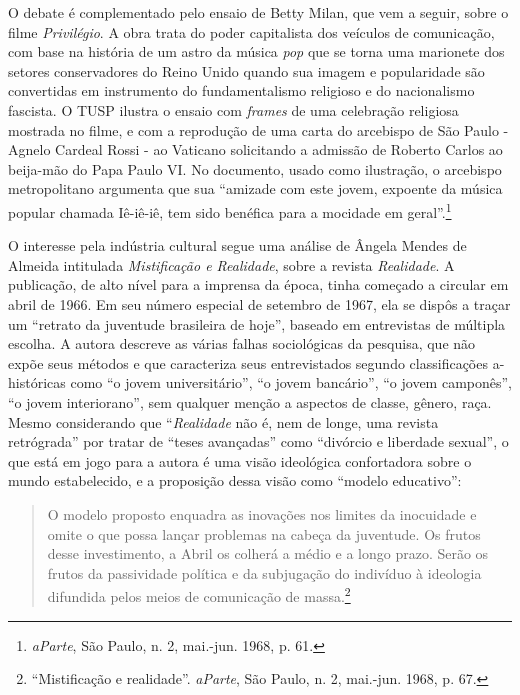 O debate é complementado pelo ensaio de Betty Milan, que vem a seguir,
sobre o filme \textit{Privilégio}. A obra trata do poder capitalista dos
veículos de comunicação, com base na história de um astro da música
\textit{pop} que se torna uma marionete dos setores conservadores do Reino
Unido quando sua imagem e popularidade são convertidas em instrumento do
fundamentalismo religioso e do nacionalismo fascista. O TUSP ilustra o
ensaio com \textit{frames} de uma celebração religiosa mostrada no filme, e
com a reprodução de uma carta do arcebispo de São Paulo - Agnelo Cardeal
Rossi - ao Vaticano solicitando a admissão de Roberto Carlos ao
beija-mão do Papa Paulo VI. No documento, usado como ilustração, o
arcebispo metropolitano argumenta que sua “amizade com este jovem,
expoente da música popular chamada Iê-iê-iê, tem sido benéfica para a
mocidade em geral”.\footnote{\textit{aParte}, São Paulo, n. 2, mai.-jun.
  1968, p. 61.}

O interesse pela indústria cultural segue uma análise de Ângela Mendes
de Almeida intitulada \textit{Mistificação e Realidade}, sobre a revista
\textit{Realidade}. A publicação, de alto nível para a imprensa da época,
tinha começado a circular em abril de 1966. Em seu número especial de
setembro de 1967, ela se dispôs a traçar um “retrato da juventude
brasileira de hoje”, baseado em entrevistas de múltipla escolha. A
autora descreve as várias falhas sociológicas da pesquisa, que não expõe
seus métodos e que caracteriza seus entrevistados segundo classificações
a-históricas como “o jovem universitário”, “o jovem bancário”, “o jovem
camponês”, “o jovem interiorano”, sem qualquer menção a aspectos de
classe, gênero, raça. Mesmo considerando que “\textit{Realidade} não é, nem
de longe, uma revista retrógrada” por tratar de “teses avançadas” como
“divórcio e liberdade sexual”, o que está em jogo para a autora é uma
visão ideológica confortadora sobre o mundo estabelecido, e a proposição
dessa visão como “modelo educativo”:

\begin{quote}
O modelo proposto enquadra as inovações nos limites da inocuidade e
omite o que possa lançar problemas na cabeça da juventude. Os frutos
desse investimento, a Abril os colherá a médio e a longo prazo. Serão os
frutos da passividade política e da subjugação do indivíduo à ideologia
difundida pelos meios de comunicação de massa.\footnote{“Mistificação e
  realidade”. \textit{aParte}, São Paulo, n. 2, mai.-jun. 1968, p. 67.}
\end{quote}

